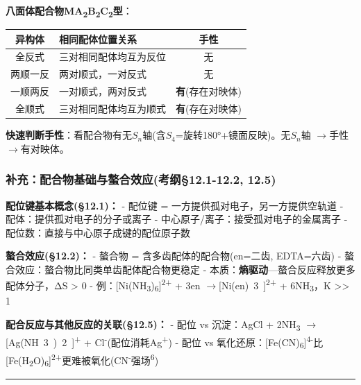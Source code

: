 \documentclass[a4paper,11pt]{ctexart}
\newcounter{none}
\newcommand{\箭}{\ensuremath{\rightarrow}}
\newcommand{\左箭}{\ensuremath{\leftarrow}}
\newcommand{\上箭}{\ensuremath{\uparrow}}
\newcommand{\下箭}{\ensuremath{\downarrow}}
\newcommand{\衡}{\ensuremath{\rightleftharpoons}}
\newcommand{\双箭}{\ensuremath{\leftrightarrow}}
\newcommand{\约等于}{\ensuremath{\approx}}
\newcommand{\小于等于}{\ensuremath{\leq}}
\newcommand{\大于等于}{\ensuremath{\geq}}
\newcommand{\不等于}{\ensuremath{\neq}}
\newcommand{\西格马}{\ensuremath{\sigma}}
\newcommand{\派}{\ensuremath{\pi}}
\begin{document}
\textbf{八面体配合物MA\textsubscript{2}B\textsubscript{2}C\textsubscript{2}型}：

{\def\LTcaptype{none} %
\begin{longtable}[]{@{}clc@{}}
\toprule\noalign{}
异构体 & 相同配体位置关系 & 手性 \\
\midrule\noalign{}
\endhead
\bottomrule\noalign{}
\endlastfoot
全反式 & 三对相同配体均互为反位 & 无 \\
两顺一反 & 两对顺式，一对反式 & 无 \\
一顺两反 & 一对顺式，两对反式 & \textbf{有}(存在对映体) \\
全顺式 & 三对相同配体均互为顺式 & \textbf{有}(存在对映体) \\
\end{longtable}
}

\textbf{快速判断手性}：看配合物有无\(S_n\)轴(含\(S_4\)=旋转180°+镜面反映)。无\(S_n\)轴 \箭 手性 \箭 有对映体。

\subsubsection{补充：配合物基础与螯合效应(考纲§12.1-12.2, 12.5)}\label{ux8865ux5145ux914dux5408ux7269ux57faux7840ux4e0eux87afux5408ux6548ux5e94ux8003ux7eb212.1-12.2-12.5}

\textbf{配位键基本概念(§12.1)：}
- 配位键 = 一方提供孤对电子，另一方提供空轨道
- 配体：提供孤对电子的分子或离子
- 中心原子/离子：接受孤对电子的金属离子
- 配位数：直接与中心原子成键的配位原子数

\textbf{螯合效应(§12.2)：}
- 螯合物 = 含多齿配体的配合物(en=二齿, EDTA=六齿)
- 螯合效应：螯合物比同类单齿配体配合物更稳定
- 本质：\textbf{熵驱动}---螯合反应释放更多配体分子，ΔS \textgreater{} 0
- 例：{[}Ni(NH\textsubscript{3})\textsubscript{6}{]}\textsuperscript{2+} + 3en \箭 [Ni(en)~3~]\textsuperscript{2+} + 6NH\textsubscript{3}，K \textgreater\textgreater{} 1

\textbf{配合反应与其他反应的关联(§12.5)：}
- 配位 vs 沉淀：AgCl + 2NH\textsubscript{3} \箭 [Ag(NH~3~)~2~]\textsuperscript{+} + Cl\textsuperscript{-}(配位消耗Ag\textsuperscript{+})
- 配位 vs 氧化还原：{[}Fe(CN)\textsubscript{6}{]}\textsuperscript{4-}比{[}Fe(H\textsubscript{2}O)\textsubscript{6}{]}\textsuperscript{2+}更难被氧化(CN\textsuperscript{-}强场\textsuperscript{6})

\begin{center}\rule{0.5\linewidth}{0.5pt}\end{center}
\end{document}
